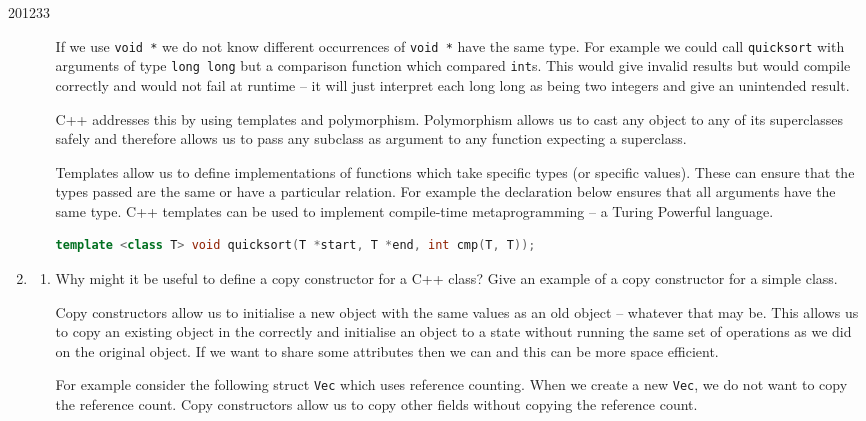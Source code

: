\documentclass[10pt,\jkfside,a4paper]{article}
\begin{document}
\begin{examquestion}{2012}{3}{3}
\begin{enumerate}[label=(\alph*)]
\begin{enumerate}[label=(\roman*)]
If we use \texttt{void *} we do not know different occurrences of
\texttt{void *} have the same type. For example we could call
\texttt{quicksort} with arguments of type \texttt{long long} but a comparison
function which compared \texttt{int}s. This would give invalid results
but would compile correctly and would not fail at runtime -- it will
just interpret each long long as being two integers and give an unintended
result.

C++ addresses this by using templates and polymorphism. Polymorphism allows
us to cast any object to any of its superclasses safely and therefore allows
us to pass any subclass as argument to any function expecting a superclass.

Templates allow us to define implementations of functions which take
specific types (or specific values). These can ensure that the types passed
are the same or have a particular relation. For example the declaration
below ensures that all arguments have the same type. C++ templates can be
used to implement compile-time metaprogramming -- a Turing Powerful language.

\begin{lstlisting}[language=C++]
template <class T> void quicksort(T *start, T *end, int cmp(T, T));
\end{lstlisting}

\end{enumerate}

\item

\begin{enumerate}[label=(\roman*)]

\item Why might it be useful to define a copy constructor for a C++ class?
Give an example of a copy constructor for a simple class.

Copy constructors allow us to initialise a new object with the same values
as an old object -- whatever that may be. This allows us to copy an existing
object in the correctly and initialise an object to a state without running
the same set of operations as we did on the original object. If we want to
share some attributes then we can and this can be more space efficient.

For example consider the following struct \texttt{Vec} which uses reference
counting. When we create a new \texttt{Vec}, we do not want to copy the
reference count. Copy constructors allow us to copy other fields without
copying the reference count.


\end{enumerate}
\end{enumerate}
\end{examquestion}
\end{document}
